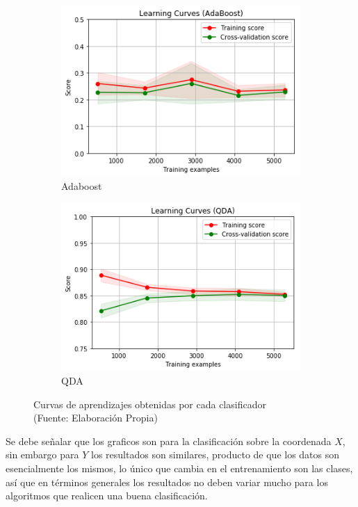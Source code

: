 \begin{figure}[ht!]
\begin{subfigure}{.5\textwidth}
  \centering
  \includegraphics[width=.8\linewidth]{figures/adaboost.png}
  \caption{Adaboost}
  \label{fig:sub1}
\end{subfigure}%
\begin{subfigure}{.5\textwidth}
  \centering
  \includegraphics[width=.8\linewidth]{figures/qda.png}
  \caption{QDA}
  \label{fig:sub2}
\end{subfigure}
\caption[abs]{Curvas de aprendizajes obtenidas por cada clasificador \\
{\scriptsize (Fuente: Elaboración Propia)}}
\label{fig:comparativa_clasificadores}
\end{figure}

Se debe señalar que los graficos son para la clasificación sobre la coordenada $X$, sin embargo para $Y$ los resultados son similares, producto de que los datos son esencialmente los mismos, lo único que cambia en el entrenamiento son las clases, así que en términos generales los resultados no deben variar mucho para los algoritmos que realicen una buena clasificación.

